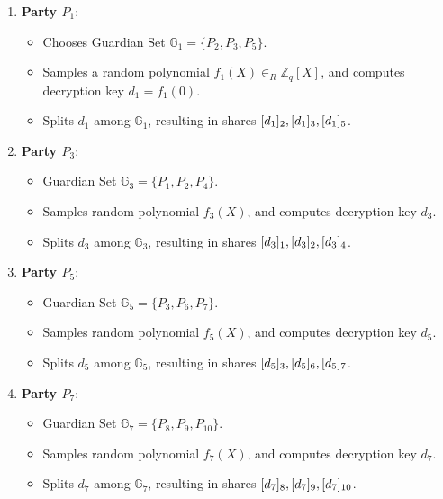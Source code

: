 \documentclass{article}
\begin{document}
\begin{enumerate}
    \item \textbf{Party $P_1$}:
    \begin{itemize}
        \item Chooses Guardian Set $\mathbb{G}_1 = \{P_2, P_3, P_5\}$.
        \item Samples a random polynomial $f_1(X) \in_R \mathbb{Z}_q[X]$, and computes decryption key $d_1 = f_1(0)$.
        \item Splits $d_1$ among $\mathbb{G}_1$, resulting in shares $[d_{1}]_{2}, [d_{1}]_{3}, [d_{1}]_{5}$.
    \end{itemize}

    \item \textbf{Party $P_3$}:
    \begin{itemize}
        \item Guardian Set $\mathbb{G}_3 = \{P_1, P_2, P_4\}$.
        \item Samples random polynomial $f_3(X)$, and computes decryption key $d_3$.
        \item Splits $d_3$ among $\mathbb{G}_3$, resulting in shares $[d_{3}]_{1}, [d_{3}]_{2}, [d_{3}]_{4}$.
    \end{itemize}

    \item \textbf{Party $P_5$}:
    \begin{itemize}
        \item Guardian Set $\mathbb{G}_5 = \{P_3, P_6, P_7\}$.
        \item Samples random polynomial $f_5(X)$, and computes decryption key $d_5$.
        \item Splits $d_5$ among $\mathbb{G}_5$, resulting in shares $[d_{5}]_{3}, [d_{5}]_{6}, [d_{5}]_{7}$.
    \end{itemize}

    \item \textbf{Party $P_7$}:
    \begin{itemize}
        \item Guardian Set $\mathbb{G}_7 = \{P_8, P_9, P_{10}\}$.
        \item Samples random polynomial $f_7(X)$, and computes decryption key $d_7$.
        \item Splits $d_7$ among $\mathbb{G}_7$, resulting in shares $[d_{7}]_{8}, [d_{7}]_{9}, [d_{7}]_{10}$.
    \end{itemize}


\end{enumerate}
\end{document}
